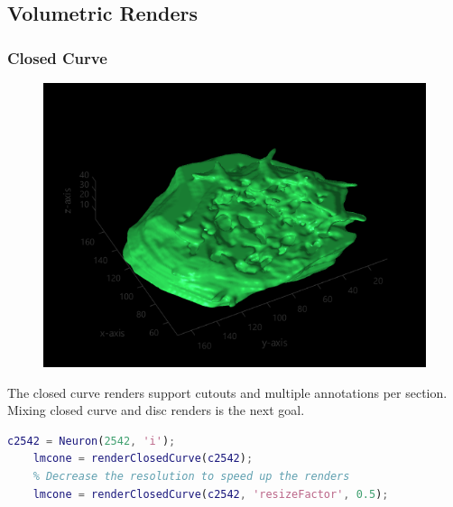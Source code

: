 \documentclass[12pt]{exam}
\begin{document}
	\subsection{Volumetric Renders}
	\subsubsection{Closed Curve}
	\begin{figure}
		\includegraphics[width=\linewidth]{lmcone_render}
		\label{blenderParasol}
	\end{figure}
	The closed curve renders support cutouts and multiple annotations per section. Mixing closed curve and disc renders is the next goal.
	\begin{lstlisting}[language=matlab]
	c2542 = Neuron(2542, 'i');
	lmcone = renderClosedCurve(c2542);
	% Decrease the resolution to speed up the renders
	lmcone = renderClosedCurve(c2542, 'resizeFactor', 0.5);\end{lstlisting}
\end{document}
